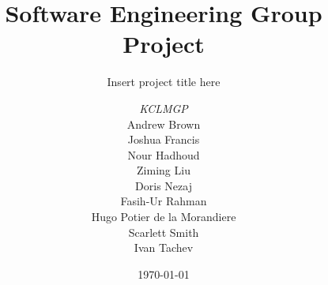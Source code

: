 \documentclass[a4paper, 12pt]{report}
\title{Software Engineering Group Project}
\subtitle{Insert project title here}%
\author{\textit{KCLMGP}\\   %
Andrew Brown\\                        %
Joshua Francis\\                        %
Nour Hadhoud\\                      %
Ziming Liu\\                       %
Doris Nezaj\\           
Fasih-Ur Rahman\\                  %
Hugo Potier de la Morandiere\\          %
Scarlett Smith\\                      %
Ivan Tachev\\                      %
}
\date{\today}
\begin{document}
    \maketitle
    \romantableofcontents

    
    
    
    
    
    

    \appendix
\end{document}
